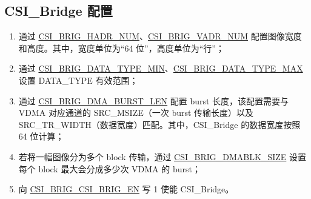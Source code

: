 \documentclass[main\_\_CN.tex]{subfiles}
\begin{document}
\subsection{CSI\_Bridge 配置}
\label{sec:isp_csi_bridge_proc}
\begin{enumerate}
    \item 通过 \hyperref[fielddesc:CSIBRIGHADRNUM]{CSI\_BRIG\_HADR\_NUM}、\hyperref[fielddesc:CSIBRIGVADRNUM]{CSI\_BRIG\_VADR\_NUM} 配置图像宽度和高度。其中，宽度单位为“64 位”，高度单位为“行”；

    \item 通过 \hyperref[fielddesc:CSIBRIGDATATYPEMIN]{CSI\_BRIG\_DATA\_TYPE\_MIN}、\hyperref[fielddesc:CSIBRIGDATATYPEMAX]{CSI\_BRIG\_DATA\_TYPE\_MAX} 设置 DATA\_TYPE 有效范围；

    \item 通过 \hyperref[fielddesc:CSIBRIGDMABURSTLEN]{CSI\_BRIG\_DMA\_BURST\_LEN} 配置 burst 长度，该配置需要与 VDMA 对应通道的 SRC\_MSIZE（一次 burst 传输长度）以及 SRC\_TR\_WIDTH（数据宽度）匹配。其中，CSI\_Bridge 的数据宽度按照 64 位计算；

    \item 若将一幅图像分为多个 block 传输，通过 \hyperref[fielddesc:CSIBRIGDMABLKSIZE]{CSI\_BRIG\_DMABLK\_SIZE} 设置每个 block 最大会分成多少次 VDMA 的 burst；

    \item 向 \hyperref[fielddesc:CSIBRIGCSIBRIGEN]{CSI\_BRIG\_CSI\_BRIG\_EN} 写 1 使能 CSI\_Bridge。
\end{enumerate}
\end{document}
